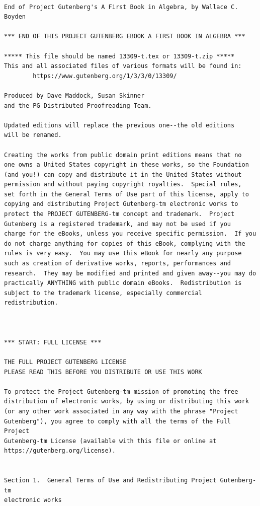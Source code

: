 \documentclass{book}
\begin{document}
\newpage
\small
{}
\begin{verbatim}

End of Project Gutenberg's A First Book in Algebra, by Wallace C. Boyden

*** END OF THIS PROJECT GUTENBERG EBOOK A FIRST BOOK IN ALGEBRA ***

***** This file should be named 13309-t.tex or 13309-t.zip *****
This and all associated files of various formats will be found in:
        https://www.gutenberg.org/1/3/3/0/13309/

Produced by Dave Maddock, Susan Skinner
and the PG Distributed Proofreading Team.

Updated editions will replace the previous one--the old editions
will be renamed.

Creating the works from public domain print editions means that no
one owns a United States copyright in these works, so the Foundation
(and you!) can copy and distribute it in the United States without
permission and without paying copyright royalties.  Special rules,
set forth in the General Terms of Use part of this license, apply to
copying and distributing Project Gutenberg-tm electronic works to
protect the PROJECT GUTENBERG-tm concept and trademark.  Project
Gutenberg is a registered trademark, and may not be used if you
charge for the eBooks, unless you receive specific permission.  If you
do not charge anything for copies of this eBook, complying with the
rules is very easy.  You may use this eBook for nearly any purpose
such as creation of derivative works, reports, performances and
research.  They may be modified and printed and given away--you may do
practically ANYTHING with public domain eBooks.  Redistribution is
subject to the trademark license, especially commercial
redistribution.



*** START: FULL LICENSE ***

THE FULL PROJECT GUTENBERG LICENSE
PLEASE READ THIS BEFORE YOU DISTRIBUTE OR USE THIS WORK

To protect the Project Gutenberg-tm mission of promoting the free
distribution of electronic works, by using or distributing this work
(or any other work associated in any way with the phrase "Project
Gutenberg"), you agree to comply with all the terms of the Full Project
Gutenberg-tm License (available with this file or online at
https://gutenberg.org/license).


Section 1.  General Terms of Use and Redistributing Project Gutenberg-tm
electronic works


\end{verbatim}
\end{document}
